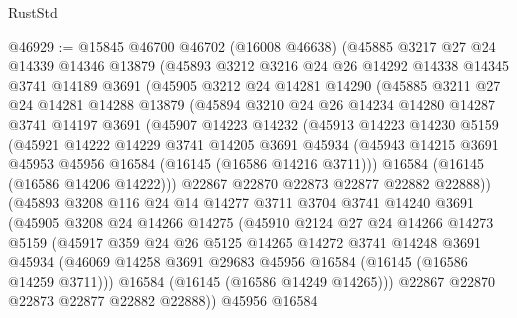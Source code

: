 \begin{lexlean}{RustStd}
\begin{coremodule}
@46929 := @15845
    @46700
    @46702
    (@16008 @46638)
    (@45885
      @3217
      @27
      @24
      @14339
      @14346
      @13879
      (@45893
        @3212
        @3216
        @24
        @26
        @14292
        @14338
        @14345
        @3741
        @14189
        @3691
        (@45905
          @3212
          @24
          @14281
          @14290
          (@45885
            @3211
            @27
            @24
            @14281
            @14288
            @13879
            (@45894
              @3210
              @24
              @26
              @14234
              @14280
              @14287
              @3741
              @14197
              @3691
              (@45907
                @14223
                @14232
                (@45913
                  @14223
                  @14230
                  @5159
                  (@45921
                    @14222
                    @14229
                    @3741
                    @14205
                    @3691
                    @45934
                    (@45943 @14215 @3691 @45953 @45956 @16584 (@16145 (@16586 @14216 @3711)))
                    @16584
                    (@16145 (@16586 @14206 @14222)))
                  @22867
                  @22870
                  @22873
                  @22877
                  @22882
                  @22888))
              (@45893
                @3208
                @116
                @24
                @14
                @14277
                @3711
                @3704
                @3741
                @14240
                @3691
                (@45905
                  @3208
                  @24
                  @14266
                  @14275
                  (@45910
                    @2124
                    @27
                    @24
                    @14266
                    @14273
                    @5159
                    (@45917
                      @359
                      @24
                      @26
                      @5125
                      @14265
                      @14272
                      @3741
                      @14248
                      @3691
                      @45934
                      (@46069 @14258 @3691 @29683 @45956 @16584 (@16145 (@16586 @14259 @3711)))
                      @16584
                      (@16145 (@16586 @14249 @14265)))
                    @22867
                    @22870
                    @22873
                    @22877
                    @22882
                    @22888))
                @45956
                @16584

\end{coremodule}
\end{lexlean}

